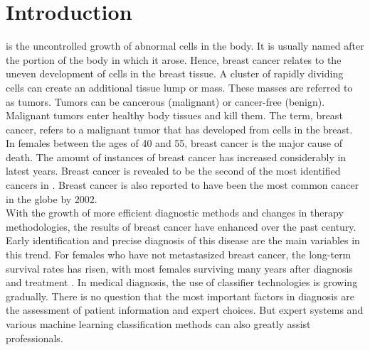 \documentclass[journal]{IEEEtran}
\begin{document}
\section{Introduction}
% 
% 
% 
% 
 is the uncontrolled growth of abnormal cells in the body. It is usually named after the portion of the body in which it arose. Hence, breast cancer relates to the uneven development of cells in the breast tissue. A cluster of rapidly dividing cells can create an additional tissue lump or mass. These masses are referred to as tumors. Tumors can be cancerous (malignant) or cancer-free (benign). Malignant tumors enter healthy body tissues and kill them. The term, breast cancer, refers to a malignant tumor that has developed from cells in the breast. In females between the ages of 40 and 55, breast cancer is the major cause of death. The amount of instances of breast cancer has increased considerably in latest years. Breast cancer is revealed to be the second of the most identified cancers in \cite{cancer_data}. Breast cancer is also reported to have been the most common cancer in the globe by 2002.\\

With the growth of more efficient diagnostic methods and changes in therapy methodologies, the results of breast cancer have enhanced over the past century. Early identification and precise diagnosis of this disease are the main variables in this trend. For females who have not metastasized breast cancer, the long-term survival rates has risen, with most females surviving many years after diagnosis and treatment \cite{west2005ensemble}. In medical diagnosis, the use of classifier technologies is growing gradually. There is no question that the most important factors in diagnosis are the assessment of patient information and expert choices. But expert systems and various machine learning classification methods can also greatly assist professionals.

\end{document}
